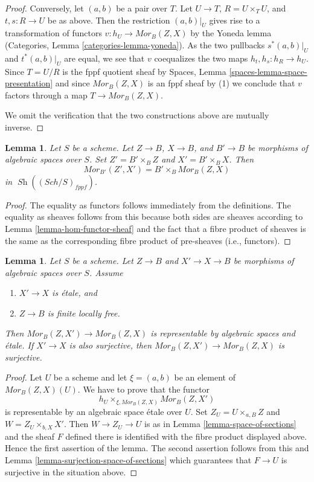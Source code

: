 \documentclass{stacks-project}
\theoremstyle{plain}
\newtheorem{lemma}[subsection]{Lemma}
\theoremstyle{definition}
\theoremstyle{remark}
\numberwithin{equation}{subsection}
\def\Sch{\mathit{Sch}}
\def\Sh{\mathop{\mathit{Sh}}\nolimits}
\begin{document}
\begin{proof}
\medskip\noindent
Conversely, let $(a, b)$ be a pair over $T$.
Let $U \to T$, $R = U \times_T U$, and $t, s : R \to U$ be as
above. Then the restriction $(a, b)|_U$ gives rise to a
transformation of functors $v : h_U \to \mathit{Mor}_B(Z, X)$ by the
Yoneda lemma
(Categories, Lemma \ref{categories-lemma-yoneda}).
As the two pullbacks $s^*(a, b)|_U$ and $t^*(a, b)|_U$
are equal, we see that $v$ coequalizes the two maps
$h_t, h_s : h_R \to h_U$. Since $T = U/R$ is the fppf quotient sheaf by
Spaces, Lemma \ref{spaces-lemma-space-presentation}
and since $\mathit{Mor}_B(Z, X)$ is an fppf sheaf by (1) we conclude
that $v$ factors through a map $T \to \mathit{Mor}_B(Z, X)$.

\medskip\noindent
We omit the verification that the two constructions above are mutually
inverse.
\end{proof}

\begin{lemma}
\label{lemma-base-change-hom-functor}
Let $S$ be a scheme. Let $Z \to B$, $X \to B$, and $B' \to B$
be morphisms of algebraic spaces over $S$. Set $Z' = B' \times_B Z$
and $X' = B' \times_B X$. Then
$$
\mathit{Mor}_{B'}(Z', X')
=
B' \times_B \mathit{Mor}_B(Z, X)
$$
in $\Sh((\Sch/S)_{fppf})$.
\end{lemma}

\begin{proof}
The equality as functors follows immediately from the definitions.
The equality as sheaves follows from this because both sides are
sheaves according to
Lemma \ref{lemma-hom-functor-sheaf}
and the fact that a fibre product of sheaves is the same as the
corresponding fibre product of pre-sheaves (i.e., functors).
\end{proof}

\begin{lemma}
\label{lemma-etale-covering-hom-functor}
Let $S$ be a scheme. Let $Z \to B$ and $X' \to X \to B$ be morphisms of
algebraic spaces over $S$. Assume
\begin{enumerate}
\item $X' \to X$ is \'etale, and
\item $Z \to B$ is finite locally free.
\end{enumerate}
Then $\mathit{Mor}_B(Z, X') \to \mathit{Mor}_B(Z, X)$ is representable
by algebraic spaces and \'etale. If $X' \to X$ is also surjective,
then $\mathit{Mor}_B(Z, X') \to \mathit{Mor}_B(Z, X)$ is surjective.
\end{lemma}

\begin{proof}
Let $U$ be a scheme and let $\xi = (a, b)$ be an element of
$\mathit{Mor}_B(Z, X)(U)$. We have to prove that the functor
$$
h_U \times_{\xi, \mathit{Mor}_B(Z, X)} \mathit{Mor}_B(Z, X')
$$
is representable by an algebraic space \'etale over $U$. Set
$Z_U = U \times_{a, B} Z$ and $W = Z_U \times_{b, X} X'$.
Then $W \to Z_U \to U$ is as in
Lemma \ref{lemma-space-of-sections}
and the sheaf $F$ defined there is identified with the fibre product
displayed above. Hence the first assertion of the lemma.
The second assertion follows from this and
Lemma \ref{lemma-surjection-space-of-sections}
which guarantees that $F \to U$ is surjective in the situation above.
\end{proof}
\end{document}

